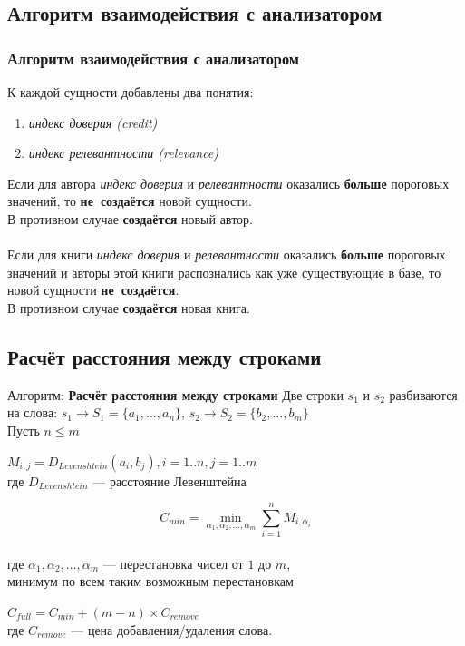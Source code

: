 \documentclass[utf8,handout]{beamer}
\begin{document}
	\subsection{Алгоритм взаимодействия с анализатором}
	\begin{frame}
 		\frametitle{Алгоритм взаимодействия с анализатором}
 		\begin{block}{}
	 		К каждой сущности добавлены два понятия:
 			\begin{enumerate}
 				\item {\em индекс доверия (credit)}
 				\item {\em индекс релевантности (relevance)}
 			\end{enumerate}
 		\end{block}
 		\begin{block}{}
			Если для автора {\em индекс доверия} и {\em релевантности} оказались \textbf{больше} пороговых значений, то
			\textbf{не~создаётся} новой сущности.\\
			В противном случае \textbf{создаётся} новый автор.\\
			~ \\
			Если для книги {\em индекс доверия} и {\em релевантности} оказались \textbf{больше} пороговых значений и
			авторы этой книги распознались как уже существующие в базе, то новой сущности \textbf{не~создаётся}.\\
			В противном случае \textbf{создаётся} новая книга.
		\end{block}
 	\end{frame}

	\subsection{Расчёт расстояния между строками}
	\begin{frame}
 		\begin{block}{Алгоритм: \textbf{Расчёт расстояния между строками}}
 			Две строки $s_{1}$ и $s_{2}$ разбиваются на слова:
 			$s_{1}\rightarrow S_{1}=\lbrace a_{1},\ldots,a_{n}\rbrace$, $s_{2}\rightarrow S_{2}=\lbrace b_{2},\ldots,b_{m}\rbrace$ \\
 			Пусть $n\leq m$

			$ M_{i,j} = D_{Levenshtein}(a_{i},b_{j}), i=1..n, j=1..m $ \\
			где $D_{Levenshtein}$ --- расстояние Левенштейна
			
			\[	C_{min}=\min_{\alpha_1, \alpha_2, \ldots, \alpha_m}{\sum_{i=1}^{n} M_{i,\alpha_{i}}} \] \\
			где $\alpha_1, \alpha_2, \ldots, \alpha_m$ --- перестановка чисел от $1$ до $m$,\\
			минимум по всем таким возможным перестановкам

			$C_{full}=C_{min}+(m-n)\times C_{remove}$\\
			где $C_{remove}$ --- цена добавления/удаления слова.
		\end{block}
	\end{frame}
\end{document}
